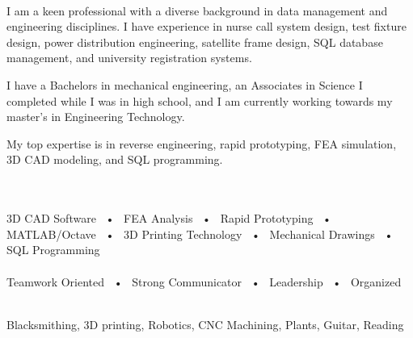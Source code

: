 \documentclass[allblack]{simplehipstercv}
\begin{document}
\begin{paracol}{2}


\paracolbackgroundoptions


\footnotesize
{\setasidefontcolour
\flushleft

\\[0.5em]

{\footnotesize
I am a keen professional with a diverse background in data management and engineering disciplines. I have experience in nurse call system design, test fixture design, power distribution engineering, satellite frame design, SQL database management, and university registration systems.\newline 

I have a Bachelors in mechanical engineering, an Associates in Science I completed while I was in high school, and I am currently working towards my master's in Engineering Technology.\newline

My top expertise is in reverse engineering, rapid prototyping, FEA simulation, 3D CAD modeling, and SQL programming.}\\
\bigskip
{} \\[0.5em]

    3D CAD Software ~•~ FEA Analysis ~•~ Rapid Prototyping ~•~ MATLAB/Octave ~•~ 3D Printing Technology ~•~ Mechanical Drawings ~•~ SQL Programming\\

\bigskip
{} \\[0.5em]

    Teamwork Oriented ~•~ Strong Communicator ~•~ Leadership ~•~ Organized \\

\bigskip

\\[0.5em]

Blacksmithing, 3D printing, Robotics, CNC Machining, Plants, Guitar, Reading\\
\bigskip


}
\end{paracol}
\end{document}
